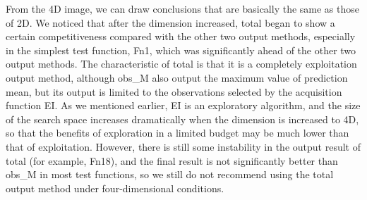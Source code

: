 \documentclass{article}
\begin{document}
From the 4D image, we can draw conclusions that are basically the same as those of 2D. We noticed that after the dimension increased, total began to show a certain competitiveness compared with the other two output methods, especially in the simplest test function, Fn1, which was significantly ahead of the other two output methods. The characteristic of total is that it is a completely exploitation output method, although obs\_M also output the maximum value of prediction mean, but its output is limited to the observations selected by the acquisition function EI. As we mentioned earlier, EI is an exploratory algorithm, and the size of the search space increases dramatically when the dimension is increased to 4D, so that the benefits of exploration in a limited budget may be much lower than that of exploitation. However, there is still some instability in the output result of total (for example, Fn18), and the final result is not significantly better than obs\_M in most test functions, so we still do not recommend using the total output method under four-dimensional conditions.
\end{document}

